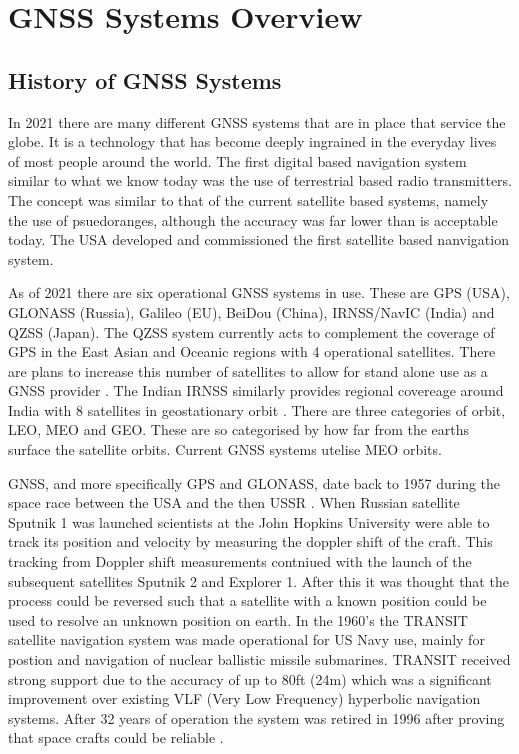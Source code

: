 
\chapter{GNSS Systems Overview} %

\label{Chapter2} %


\section{History of GNSS Systems} \label{sec:GNSSHistory}
In 2021 there are many different GNSS systems that are in place that service the globe. It is a technology that has become deeply ingrained in the everyday lives of most
people around the world. The first digital based navigation system similar to what we know today was the use of terrestrial based radio transmitters. The concept was
similar to that of the current satellite based systems, namely the use of psuedoranges, although the accuracy was far lower than is acceptable today. The USA developed and commissioned the first
satellite based nanvigation system.

As of 2021 there are six operational GNSS systems in use. These are GPS (USA), GLONASS (Russia), Galileo (EU), BeiDou (China), IRNSS/NavIC (India) and QZSS (Japan). The QZSS
system currently acts to complement the coverage of GPS in the East Asian and Oceanic regions with 4 operational satellites. There are plans to increase this number of
satellites to allow for stand alone use as a GNSS provider \cite{RN47}. The Indian IRNSS similarly provides regional covereage around India with 8 satellites in
geostationary orbit \cite{RN55} . There are three categories of orbit, LEO, MEO and GEO. These are so categorised by how far from the earths surface the satellite orbits. Current GNSS
systems utelise MEO orbits.

GNSS, and more specifically GPS and GLONASS, date back to 1957 during the space race between the USA and the then USSR \cite{RN43}. When Russian satellite Sputnik 1 was launched scientists at the John Hopkins University were able to track its position and velocity by measuring the doppler shift of the
craft. This tracking from Doppler shift measurements contniued with the launch of the subsequent satellites Sputnik 2 and Explorer 1. After this it was thought that the
process could be reversed such that a satellite with a known position could be used to resolve an unknown position on earth. In the 1960's the TRANSIT satellite
navigation system was made operational for US Navy use, mainly for postion and navigation of nuclear ballistic missile submarines. TRANSIT received strong support due to
the accuracy of up to 80ft (24m) which was a significant improvement over existing VLF (Very Low Frequency) hyperbolic navigation systems. After 32 years of operation the
system was retired in 1996 after proving that space crafts could be reliable \cite{RN45}. 

